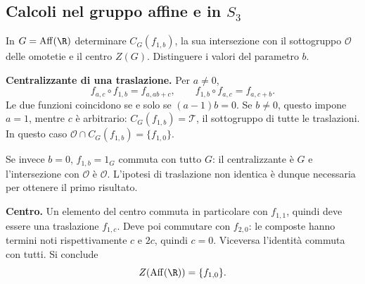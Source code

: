 \subsection{Calcoli nel gruppo affine e in \texorpdfstring{$S_3$}{S3}}
\begin{esercizio}
In $G=\operatorname{Aff}(\R)$ determinare $C_G(f_{1,b})$, la sua intersezione con il sottogruppo $\mathcal O$ delle omotetie e il centro $Z(G)$. Distinguere i valori del parametro $b$.
\end{esercizio}
\begin{svolgimento}
\textbf{Centralizzante di una traslazione.} Per $a\ne0$,
\[
f_{a,c}\circ f_{1,b}=f_{a,ab+c},\qquad
f_{1,b}\circ f_{a,c}=f_{a,c+b}.
\]
Le due funzioni coincidono se e solo se $(a-1)b=0$. Se $b\ne0$, questo impone $a=1$, mentre $c$ è arbitrario: $C_G(f_{1,b})=\mathcal T$, il sottogruppo di tutte le traslazioni. In questo caso $\mathcal O\cap C_G(f_{1,b})=\{f_{1,0}\}$.

Se invece $b=0$, $f_{1,b}=1_G$ commuta con tutto $G$: il centralizzante è $G$ e l'intersezione con $\mathcal O$ è $\mathcal O$. L'ipotesi di traslazione non identica è dunque necessaria per ottenere il primo risultato.

\textbf{Centro.} Un elemento del centro commuta in particolare con $f_{1,1}$, quindi deve essere una traslazione $f_{1,c}$. Deve poi commutare con $f_{2,0}$: le composte hanno termini noti rispettivamente $c$ e $2c$, quindi $c=0$. Viceversa l'identità commuta con tutti. Si conclude
\[
Z(\operatorname{Aff}(\R))=\{f_{1,0}\}.
\]
\end{svolgimento}

